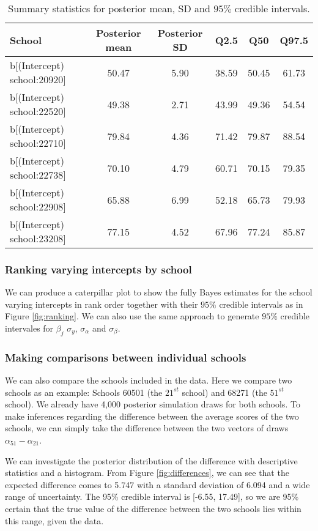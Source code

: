 \begin{table}[ht]
	\centering
	\def\arraystretch{1.3}
	{\small
		\begin{tabular}{l | c c c c c}
			School & Posterior mean & Posterior SD & Q2.5 & Q50 & Q97.5\\
			\hline
			b[(Intercept) school:20920] & 50.47 & 5.90 & 38.59 & 50.45 & 61.73 \\
			b[(Intercept) school:22520] & 49.38 & 2.71 & 43.99 & 49.36 & 54.54 \\
			b[(Intercept) school:22710] & 79.84 & 4.36 &  71.42 & 79.87 & 88.54 \\
			b[(Intercept) school:22738] & 70.10 & 4.79 & 60.71 & 70.15 & 79.35  \\
			b[(Intercept) school:22908] & 65.88 & 6.99 & 52.18 & 65.73 & 79.93 \\
			b[(Intercept) school:23208] &  77.15 & 4.52 & 67.96 & 77.24 & 85.87
		\end{tabular}
	}
	\caption{{\small Summary statistics for posterior mean, SD and $95\%$ credible intervals.}}
	\label{tab:summary_data}
\end{table}

\subsubsection{Ranking varying intercepts by school}

We can produce a caterpillar plot to show the fully Bayes estimates for the school varying intercepts in rank order together with their $95\%$ credible intervals as in Figure \ref{fig:ranking}. We can also use the same approach to generate $95\%$ credible intervales for $\beta_j$ $\sigma_y$, $\sigma_\alpha$ and $\sigma_\beta$.

\subsubsection{Making comparisons between individual schools}

We can also compare the schools included in the data.  Here we compare two schools as an example: Schools 60501 (the $21^{st}$ school) and 68271 (the $51^{st}$ school). We already have 4,000 posterior simulation draws for both schools. To make inferences regarding the difference between the average scores of the two schools, we can simply take the difference between the two vectors of draws $\alpha_{51} - \alpha_{21}$. 

We can investigate the posterior distribution of the difference with descriptive statistics and a histogram. From Figure \ref{fig:differences}, we can see that the expected difference comes to 5.747 with a standard deviation of 6.094 and a wide range of uncertainty. The 95\% credible interval is [-6.55, 17.49], so we are 95\% certain that the true value of the difference between the two schools lies within this range, given the data. 

